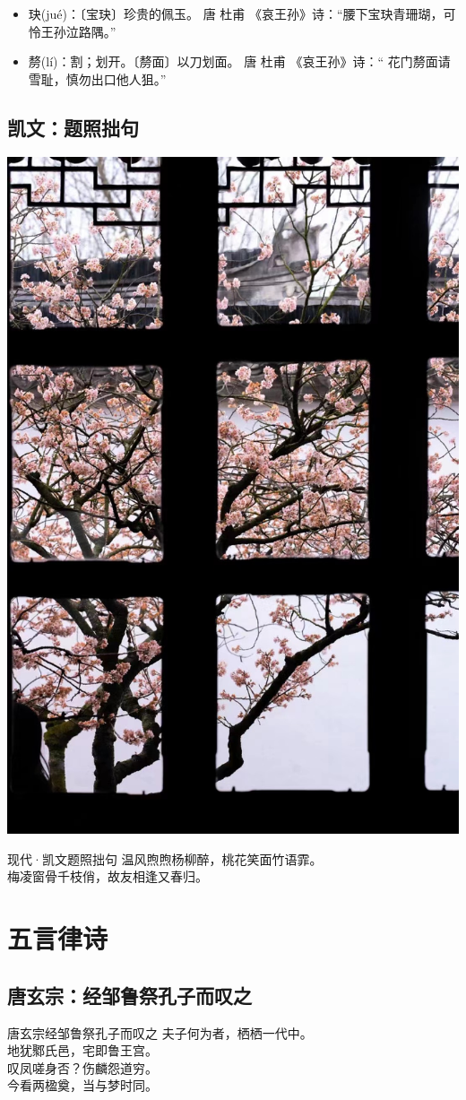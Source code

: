 \documentclass[12pt,oneside,a5paper]{book}
\begin{document}
\begin{itemize}
\item 玦(jué)：〔宝玦〕珍贵的佩玉。  唐 杜甫 《哀王孙》诗：“腰下宝玦青珊瑚，可怜王孙泣路隅。” 
\item 剺(lí)：割；划开。〔剺面〕以刀划面。 唐 杜甫 《哀王孙》诗：“ 花门剺面请雪耻，慎勿出口他人狙。”  
\end{itemize}

\chapter*{凯文：题照拙句}
\begin{center}
    \includegraphics[width=.5\textwidth,height=.5\textheight,keepaspectratio]{题照拙句.jpg}
\end{center}

\begin{poemzh}{现代·凯文}{题照拙句}
温风煦煦杨柳醉，桃花笑面竹语霏。\\
梅凌窗骨千枝俏，故友相逢又春归。\\
\end{poemzh}

\part{五言律诗}
\chapter{唐玄宗：经邹鲁祭孔子而叹之}
\begin{poemzh}{唐玄宗}{经邹鲁祭孔子而叹之}
夫子何为者，栖栖一代中。\\
地犹鄹氏邑，宅即鲁王宫。\\
叹凤嗟身否？伤麟怨道穷。\\
今看两楹奠，当与梦时同。\\ 
\end{poemzh}
\end{document}
